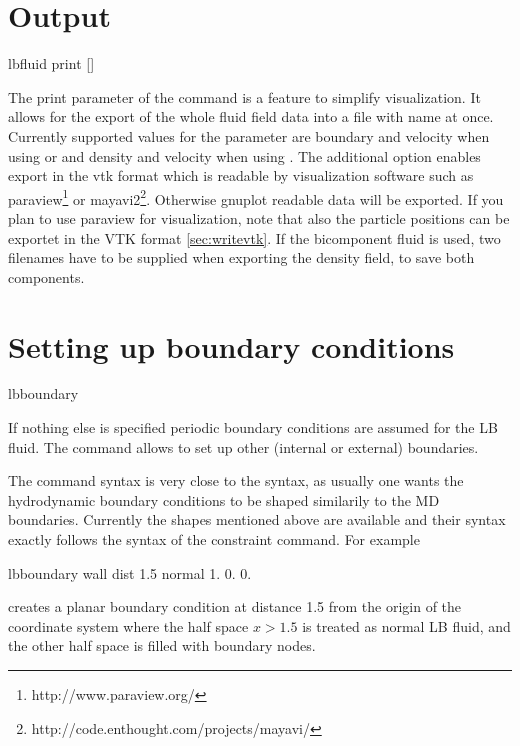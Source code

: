 \section{Output}
\label{ssec:EKoutput}
\begin{essyntax}
  lbfluid print    []
\end{essyntax}
The print parameter of the  command is a feature to simplify visualization. It allows for the export of the whole fluid field data into a 
file with name  at once. Currently supported values for the 
parameter  are boundary and velocity when using  or  and density and velocity when using . The additional option 
 enables export in the vtk format which is readable by visualization software such as paraview\footnote{http://www.paraview.org/} or mayavi2\footnote{http://code.enthought.com/projects/mayavi/}. Otherwise gnuplot readable data will be 
exported. If you plan to use paraview for visualization, note that also the 
particle positions can be exportet in the VTK format \ref{sec:writevtk}.
If the  bicomponent fluid is used, two filenames have to be supplied when exporting the density field, to save both components.


\section{Setting up boundary conditions}
\begin{essyntax}
  lbboundary   
  \begin{features}
  \end{features}
\end{essyntax}

If nothing else is specified periodic boundary conditions are assumed 
for the LB fluid. The  command allows to set up
other (internal or external) boundaries.

The  command syntax is very close to the
 syntax, as usually one wants the hydrodynamic
boundary conditions to be shaped similarily to the MD
boundaries. Currently the shapes mentioned above are available and
their syntax exactly follows the syntax of the constraint command. For
example
\begin{tclcode}
  lbboundary wall dist 1.5 normal 1. 0. 0. 
\end{tclcode}
creates a planar boundary condition at distance 1.5 from the origin of
the coordinate system where the half space $x>1.5$ is treated as
normal LB fluid, and the other half space is filled with boundary
nodes.

